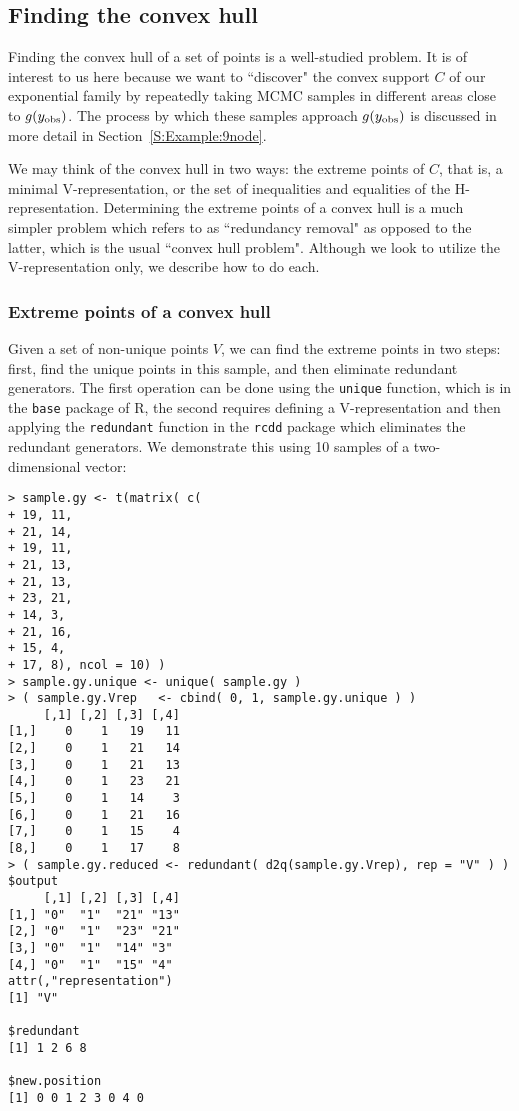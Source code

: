\subsection{Finding the convex hull}
Finding the convex hull of a set of points is a well-studied problem.  It 
is of interest to us here because we want to ``discover" the convex support $C$
of our exponential family by repeatedly taking MCMC samples in different 
areas close to $g(y_{\text{obs}})$.  The process by which these samples 
approach $g(y_{\text{obs}})$ is discussed in more detail in Section~\ref{S:Example:9node}.  

We may think of the convex hull in two ways: the extreme points of $C$, that is, 
a minimal V-representation, or the set of inequalities and equalities of the 
H-representation.  Determining the extreme points of a convex hull 
is a much simpler problem which \citet{Fukuda:2004} refers to as ``redundancy 
removal" as opposed to the latter, which is the usual ``convex hull problem".
Although we look to utilize the V-representation only, we describe how to do each.

\subsubsection{Extreme points of a convex hull}
Given a set of non-unique points $V$, we can find the extreme points in two steps:
first, find the unique points in this sample, and then eliminate redundant generators.  The first operation can be done using the \texttt{unique} function, 
which is in the \texttt{base} package of R, the second requires defining a V-representation and then applying the \texttt{redundant} function in the \texttt{rcdd}
package which eliminates the redundant generators.
We demonstrate this using 10 samples of a two-dimensional vector:
\begin{singlespace}
{ \begin{verbatim}
> sample.gy <- t(matrix( c(
+ 19, 11,
+ 21, 14,
+ 19, 11,
+ 21, 13,
+ 21, 13,
+ 23, 21,
+ 14, 3,
+ 21, 16,
+ 15, 4,
+ 17, 8), ncol = 10) )
> sample.gy.unique <- unique( sample.gy ) 
> ( sample.gy.Vrep 	 <- cbind( 0, 1, sample.gy.unique ) )
     [,1] [,2] [,3] [,4]
[1,]    0    1   19   11
[2,]    0    1   21   14
[3,]    0    1   21   13
[4,]    0    1   23   21
[5,]    0    1   14    3
[6,]    0    1   21   16
[7,]    0    1   15    4
[8,]    0    1   17    8
> ( sample.gy.reduced <- redundant( d2q(sample.gy.Vrep), rep = "V" ) )
$output
     [,1] [,2] [,3] [,4]
[1,] "0"  "1"  "21" "13"
[2,] "0"  "1"  "23" "21"
[3,] "0"  "1"  "14" "3" 
[4,] "0"  "1"  "15" "4" 
attr(,"representation")
[1] "V"

$redundant
[1] 1 2 6 8

$new.position
[1] 0 0 1 2 3 0 4 0
\end{verbatim}
}
\end{singlespace}

